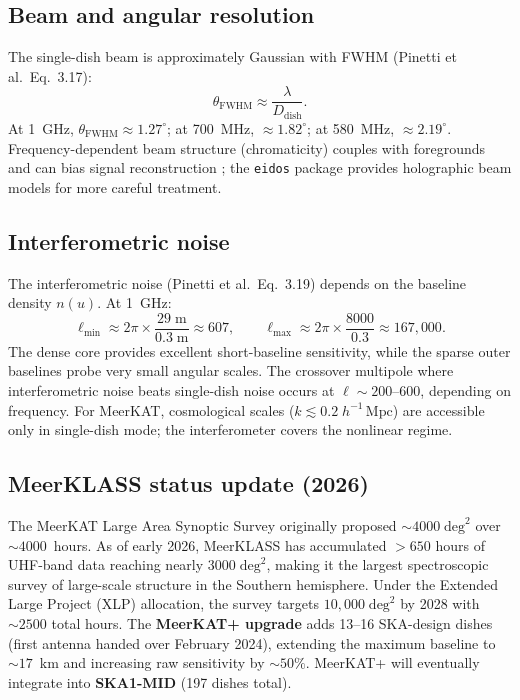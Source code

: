 \documentclass[10pt,a4paper]{article}
\newcommand{\hmpc}{h^{-1}\,\mathrm{Mpc}}
\begin{document}
\subsection{Beam and angular resolution}

The single-dish beam is approximately Gaussian with FWHM (Pinetti et al.\
Eq.~3.17):
\begin{equation}
  \theta_{\mathrm{FWHM}} \approx \frac{\lambda}{D_{\mathrm{dish}}}.
\end{equation}
At 1~GHz, $\theta_{\mathrm{FWHM}} \approx 1.27^{\circ}$; at 700~MHz,
$\approx 1.82^{\circ}$; at 580~MHz, $\approx 2.19^{\circ}$.
Frequency-dependent beam structure (chromaticity) couples with foregrounds and
can bias signal reconstruction \citep{Spinelli2021}; the \texttt{eidos}
package provides holographic beam models for more careful treatment.


\subsection{Interferometric noise}

The interferometric noise (Pinetti et al.\ Eq.~3.19) depends on the baseline
density $n(u)$.  At 1~GHz:
\begin{equation}
  \ell_{\min} \approx 2\pi \times \frac{29\;\mathrm{m}}{0.3\;\mathrm{m}}
  \approx 607, \qquad
  \ell_{\max} \approx 2\pi \times \frac{8000}{0.3} \approx 167{,}000.
\end{equation}
The dense core provides excellent short-baseline sensitivity, while the sparse
outer baselines probe very small angular scales.  The crossover multipole where
interferometric noise beats single-dish noise occurs at
$\ell \sim 200$--600, depending on frequency.  For MeerKAT, cosmological
scales ($k \lesssim 0.2\;\hmpc$) are accessible only in single-dish mode; the
interferometer covers the nonlinear regime.


\subsection{MeerKLASS status update (2026)}

The MeerKAT Large Area Synoptic Survey \citep{Santos2017} originally proposed
$\sim\!4000\;\mathrm{deg}^{2}$ over $\sim\!4000$~hours.  As of early 2026,
MeerKLASS has accumulated $> 650$ hours of UHF-band data reaching nearly
$3000\;\mathrm{deg}^{2}$, making it the largest spectroscopic survey of
large-scale structure in the Southern hemisphere.  Under the Extended Large
Project (XLP) allocation, the survey targets
$10{,}000\;\mathrm{deg}^{2}$ by 2028 with $\sim\!2500$ total hours.  The
\textbf{MeerKAT+ upgrade} adds 13--16 SKA-design dishes (first antenna handed
over February 2024), extending the maximum baseline to $\sim\!17$~km and
increasing raw sensitivity by $\sim\!50\%$.  MeerKAT+ will eventually
integrate into \textbf{SKA1-MID} (197 dishes total).
\end{document}
